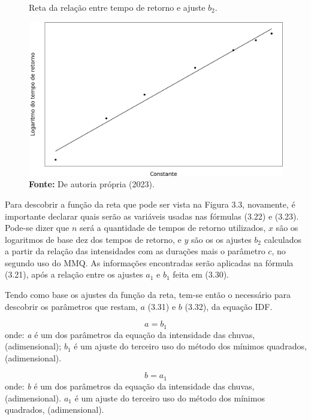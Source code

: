 \begin{figure}[!ht]
	\centering
	\caption{Reta da relação entre tempo de retorno e ajuste $b_2$.}
	\includegraphics[width=.7325\linewidth]{figuras/reta_de_tempo_de_retorno.png}
	\caption*{\textbf{Fonte:} De autoria própria (2023).}
	\label{fig:reta_de_tempo_de_retorno.png}
\end{figure}

\newpage

Para descobrir a função da reta que pode ser vista na Figura 3.3, novamente, é importante declarar quais serão as variáveis usadas nas fórmulas (3.22) e (3.23). Pode-se dizer que $n$ será a quantidade de tempos de retorno utilizados, $x$ são os logaritmos de base dez dos tempos de retorno, e $y$ são os os ajustes $b_2$ calculados a partir da relação das intensidades com as durações mais o parâmetro $c$, no segundo uso do MMQ. As informações encontradas serão aplicadas na fórmula (3.21), após a relação entre os ajustes $a_1$ e $b_1$ feita em (3.30).

Tendo como base os ajustes da função da reta, tem-se então o necessário para descobrir os parâmetros que restam, $a$ (3.31) e $b$ (3.32), da equação IDF.\bigskip

\begin{equation}
a = b_1
\end{equation}
\newline
onde:
\newline
\textit{a} é um dos parâmetros da equação da intensidade das chuvas, (adimensional);
\newline
$b_1$ é um ajuste do terceiro uso do método dos mínimos quadrados, (adimensional).\bigskip

\begin{equation}
b = a_1
\end{equation}
\newline
onde:
\newline
\textit{b} é um dos parâmetros da equação da intensidade das chuvas, (adimensional).
\newline
$a_1$ é um ajuste do terceiro uso do método dos mínimos quadrados, (adimensional).\bigskip

